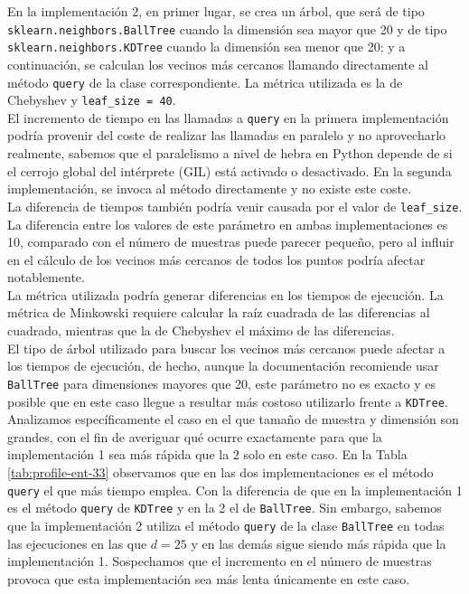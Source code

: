 \documentclass[12pt,a4paper]{report} %
\theoremstyle{definition}
\begin{document}
En la implementación 2, en primer lugar, se crea un árbol, que será de tipo \texttt{sklearn.neighbors.BallTree} cuando la dimensión sea mayor que 20 y de tipo \texttt{sklearn.neighbors.KDTree} cuando la dimensión sea menor que 20; y a continuación, se calculan los vecinos más cercanos llamando directamente al método \texttt{query} de la clase correspondiente. La métrica utilizada es la de Chebyshev y \texttt{leaf\_size = 40}.\\

El incremento de tiempo en las llamadas a \texttt{query} en la primera implementación podría provenir del coste de realizar las llamadas en paralelo y no aprovecharlo realmente, sabemos que el paralelismo a nivel de hebra en Python depende de si el cerrojo global del intérprete (GIL) está activado o desactivado. En la segunda implementación,  se invoca al método directamente y no existe este coste.\\

La diferencia de tiempos también podría venir causada por el valor de \texttt{leaf\_size}. La diferencia entre los valores de este parámetro en ambas implementaciones es 10, comparado con el número de muestras puede parecer pequeño, pero al influir en el cálculo de los vecinos más cercanos de todos los puntos podría afectar notablemente.\\

La métrica utilizada podría generar diferencias en los tiempos de ejecución. La métrica de Minkowski requiere calcular la raíz cuadrada de las diferencias al cuadrado, mientras que la de Chebyshev el máximo de las diferencias.\\ 

El tipo de árbol utilizado para buscar los vecinos más cercanos puede afectar a los tiempos de ejecución, de hecho, aunque la documentación recomiende usar \texttt{BallTree} para dimensiones mayores que 20, este parámetro no es exacto y es posible que en este caso llegue a resultar más costoso utilizarlo frente a \texttt{KDTree}.\\

Analizamos específicamente el caso en el que tamaño de muestra y dimensión son grandes, con el fin de averiguar qué ocurre exactamente para que la implementación 1 sea más rápida que la 2 solo en este caso. En la Tabla \ref{tab:profile-ent-33} observamos que en las dos implementaciones es el método \texttt{query} el que más tiempo emplea. Con la diferencia de que en la implementación 1 es el método \texttt{query} de \texttt{KDTree} y en la 2 el de \texttt{BallTree}. Sin embargo, sabemos que la implementación 2 utiliza el método \texttt{query} de la clase \texttt{BallTree} en todas las ejecuciones en las que $d= 25$ y en las demás sigue siendo más rápida que la implementación 1. Sospechamos que el incremento en el número de muestras provoca que esta implementación sea más lenta únicamente en este caso.\\
\end{document}
